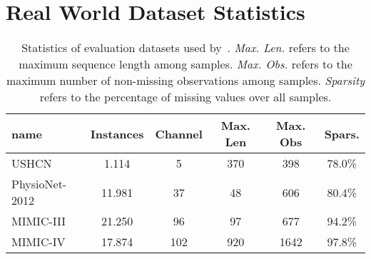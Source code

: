 \section{Real World Dataset Statistics}\label{sec:rw_dsinfo}

\begin{table}[H]
\centering
\caption{%
	Statistics of evaluation datasets used by~\citet{DeBrouwer2019.GRUODEBayesd,Bilos2021.Neurald,Schirmer2022.Modelingb}.
	\emph{Max. Len.} refers to the maximum sequence length among samples.
	\emph{Max. Obs.} refers to the maximum number of non-missing observations among samples.
	\emph{Sparsity} refers to the percentage of missing values over all samples.
}\label{tab:data}
\begin{tabular}{lccccc}
	\toprule
	name			& Instances & Channel & Max. Len & Max. Obs & Spars.
\\	\midrule
	USHCN			& 1.114    & 5        & 370      & 398      & 78.0\%
\\	PhysioNet-2012	& 11.981   & 37       & 48       & 606      & 80.4\%
\\	MIMIC-III		& 21.250   & 96       & 97       & 677      & 94.2\%
\\	MIMIC-IV		& 17.874   & 102      & 920      & 1642     & 97.8\%
\\	\bottomrule
\end{tabular}
\end{table}
